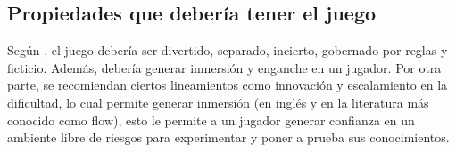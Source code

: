 \documentclass[submission]{eptcs}
\begin{document}


\subsection{Propiedades que debería tener el juego}

Según \cite{evaluation_of_games_for_teaching_cs}, el juego debería ser divertido, separado, incierto,
gobernado por reglas y ficticio. Además, debería generar inmersión y enganche en un jugador. Por otra parte,
se recomiendan ciertos lineamientos como innovación y escalamiento en la dificultad, lo cual permite generar
inmersión (en inglés y en la literatura más conocido como flow), esto le permite a un jugador generar confianza en
un ambiente libre de riesgos para experimentar y poner a prueba sus conocimientos. 
\end{document}
